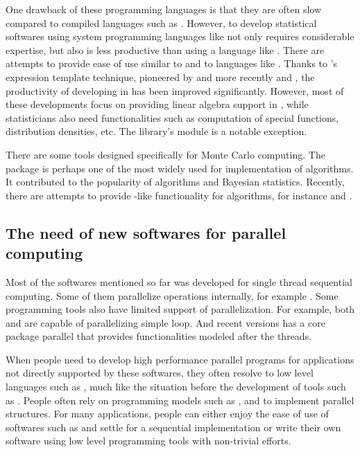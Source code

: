 One drawback of these programming languages is that they are often slow
compared to compiled languages such as \cpp. However, to develop statistical
softwares using system programming languages like \cpp not only requires
considerable expertise, but also is less productive than using a language like
\rlang. There are attempts to provide ease of use similar to \matlab and
\rlang to languages like \cpp. Thanks to \cpp's expression template technique,
pioneered by \blitzpp and more recently \armadillo and \eigen, the
productivity of developing in \cpp has been improved significantly. However,
most of these developments focus on providing linear algebra support in \cpp,
while statisticians also need functionalities such as computation of special
functions, distribution densities, etc. The \boost \cite{boost} library's
 module is a notable exception.

There are some tools designed specifically for Monte Carlo computing. The
\bugs \cite{bugs} package is perhaps one of the most widely used for
implementation of \mcmc algorithms. It contributed to the popularity of \mcmc
algorithms and Bayesian statistics. Recently, there are attempts to provide
\bugs-like functionality for \smc algorithms, for instance \biips \cite{biips}
and \libbi \cite{libbi}.

\subsection{The need of new softwares for parallel computing}
\label{sub:The need of new softwares for parallel computing}

Most of the softwares mentioned so far was developed for single thread
sequential computing. Some of them parallelize operations internally, for
example \libbi. Some programming tools also have limited support of
parallelization. For example, both \matlab and \mathematica are capable of
parallelizing simple loop. And recent versions \rlang has a core package
\textsf{parallel} that provides functionalities modeled after the \unix
threads.

When people need to develop high performance parallel programs for
applications not directly supported by these softwares, they often resolve to
low level languages such as \cpp, much like the situation before the
development of tools such as \slang. People often rely on programming models
such as \openmp \cite{openmp}, \tbb \cite{tbb} and \mpi \cite{mpi} to
implement parallel structures. For many applications, people can either enjoy
the ease of use of softwares such as \rlang and settle for a sequential
implementation or write their own software using low level programming tools
with non-trivial efforts.

